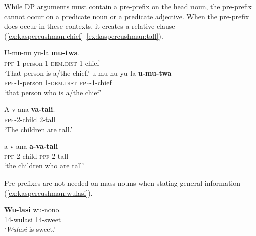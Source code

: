 \documentclass[output=paper,modfonts,nonflat]{langsci/langscibook}
\begin{document}
\begin{exe}
\end{exe}

While DP arguments must contain a pre-prefix on the head noun, the pre-prefix cannot occur on a predicate noun or a predicate adjective. When the pre-prefix does occur in these contexts, it creates a relative clause (\ref{ex:kaspercushman:chief}--\ref{ex:kaspercushman:tall}). 

\begin{exe}
\ex \label{ex:kaspercushman:chief} \begin{xlist}
\ex 
\gll U-mu-nu yu-la \textbf{mu-twa}. \\
\textsc{ppf}-1-person 1-\textsc{dem.dist} 1-chief \\
\glt `That person is a/the chief.'
\ex 
\gll u-mu-nu yu-la \textbf{u-mu-twa} \\
\textsc{ppf}-1-person 1-\textsc{dem.dist} \textsc{ppf}-1-chief \\
\glt `that person who is a/the chief'
\end{xlist}
\end{exe}

\begin{exe}

\ex \label{ex:kaspercushman:tall} \begin{xlist}

\ex 
\gll A-v-ana \textbf{va-tali}. \\
\textsc{ppf}-2-child 2-tall  \\
\glt `The children are tall.'


\ex 
\gll a-v-ana \textbf{a-va-tali} \\
\textsc{ppf}-2-child \textsc{ppf}-2-tall \\
\glt `the children who are tall'

\end{xlist}
\end{exe}

Pre-prefixes are not needed on mass nouns when stating general information (\ref{ex:kaspercushman:wulasi}). 


\begin{exe}

\ex \label{ex:kaspercushman:wulasi} 
\gll \textbf{Wu-lasi} wu-nono. \\
14-wulasi 14-sweet \\
\glt `\textit{Wulasi} is sweet.'

\end{exe}
\end{document}
